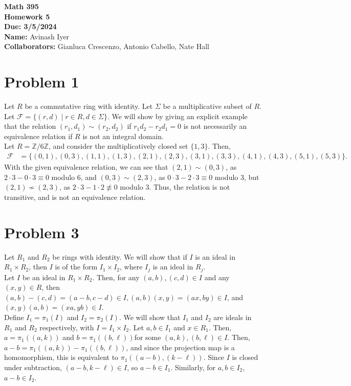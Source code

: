 \documentclass[8pt]{extarticle}
\title{}
\author{}
\date{}
\newcommand{\Z}{\mathbb{Z}}
\begin{document}
  \begin{center}
    {\bf \Large Math 395 \\[0.1in]Homework 5 \\[0.1in]
    Due: 3/5/2024}\\[.25in]
    {\bf Name:} {Avinash Iyer}\\[0.15in]
    {\bf Collaborators:} {Gianluca Crescenzo, Antonio Cabello, Nate Hall} \\
  \end{center}
  \section{Problem 1}%
  Let $R$ be a commutative ring with identity. Let $\Sigma$ be a multiplicative subset of $R$. Let $\mathcal{F} = \{(r,d)\mid r\in R, d\in \Sigma\}$. We will show by giving an explicit example that the relation $(r_1,d_1)\sim (r_2,d_2)$ if $r_1d_2 - r_2d_1 = 0$ is not necessarily an equivalence relation if $R$ is not an integral domain.\\

  Let $R = \Z/6\Z$, and consider the multiplicatively closed set $\{1,3\}$. Then,
  \begin{align*}
    \mathcal{F} &= \{(0,1),(0,3),(1,1),(1,3),(2,1),(2,3),(3,1),(3,3),(4,1),(4,3),(5,1),(5,3)\}.
  \end{align*}
  With the given equivalence relation, we can see that $(2,1)\sim (0,3)$, as $2\cdot 3 - 0\cdot 3 \equiv 0$ modulo 6, and $(0,3)\sim (2,3)$, as $0\cdot 3 - 2\cdot 3 \equiv 0$ modulo 3, but $(2,1)\nsim (2,3)$, as $2\cdot 3 - 1\cdot 2 \not\equiv 0$ modulo 3. Thus, the relation is not transitive, and is not an equivalence relation.
  \section{Problem 3}%
  Let $R_1$ and $R_2$ be rings with identity. We will show that if $I$ is an ideal in $R_1\times R_2$, then $I$ is of the form $I_1\times I_2$, where $I_j$ is an ideal in $R_j$.\\

  Let $I$ be an ideal in $R_1\times R_2$. Then, for any $(a,b),(c,d)\in I$ and any $(x,y)\in R$, then $(a,b)-(c,d) = (a-b,c-d)\in I, (a,b)(x,y) =(ax,by)\in I$, and $(x,y)(a,b) = (xa,yb)\in I$.\\

  Define $I_1 = \pi_1(I)$ and $I_2 = \pi_2(I)$. We will show that $I_1$ and $I_2$ are ideals in $R_1$ and $R_2$ respectively, with $I = I_1\times I_2$. Let $a,b\in I_1$ and $x\in R_1$. Then, $a = \pi_1((a,k))$ and $b = \pi_1((b,\ell))$for some $(a,k),(b,\ell)\in I$. Then, $a-b = \pi_1((a,k)) - \pi_1((b,\ell)) $, and since the projection map is a homomorphism, this is equivalent to $\pi_1((a-b),(k-\ell))$. Since $I$ is closed under subtraction, $(a-b,k-\ell)\in I$, so $a-b\in I_1$. Similarly, for $a,b\in I_2$, $a-b\in I_2$.\\
\end{document}
